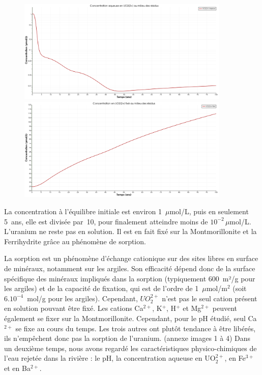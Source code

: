 \documentclass{article}
\begin{document}
\begin{figure}[H]
    \centering
    \begin{minipage}{0.5\textwidth}
        \centering
        \includegraphics[width=0.9\textwidth]{III_B_2_3.png} 
        \caption{}
        \label{fig:UO2_residus_sable_base}
    \end{minipage}\hfill
    \begin{minipage}{0.5\textwidth}
        \centering
        \includegraphics[width=0.9\textwidth]{III_B_2_4.png} 
        \caption{}
        \label{fig:UO2_fixe_residus_sable_base}
    \end{minipage}
\end{figure}

La concentration à l’équilibre initiale est environ 1~$\mu$mol/L, puis en seulement 5~ans, elle est divisée par~10, pour finalement atteindre moins de $10^{-2} \, \mu$mol/L. L’uranium ne reste pas en solution. Il est en fait fixé sur la Montmorillonite et la Ferrihydrite grâce au phénomène de sorption.


La sorption est un phénomène d’échange cationique sur des sites libres en surface de minéraux, notamment sur les argiles. Son efficacité dépend donc de la surface spécifique des minéraux impliqués dans la sorption (typiquement 600~m²/g pour les argiles) et de la capacité de fixation, qui est de l’ordre de 1~$\mu$mol/m$^2$ (soit $6 . 10^{-4}$~mol/g pour les argiles). Cependant, $UO_2^{2+}$ n’est pas le seul cation présent en solution pouvant être fixé. Les cations Ca$^{2+}$, K$^{+}$, H$^{+}$ et Mg$^{2+}$ peuvent également se fixer sur la Montmorillonite. Cependant, pour le pH étudié, seul Ca$^{2+}$ se fixe au cours du temps. Les trois autres ont plutôt tendance à être libérés, ils n’empêchent donc pas la sorption de l’uranium. (annexe images 1 à 4)
Dans un deuxième temps, nous avons regardé les caractéristiques physico-chimiques de l’eau rejetée dans la rivière : le pH, la concentration aqueuse en UO$_2^{2+}$, en Fe$^{3+}$ et en Ba$^{2+}$.
\end{document}
